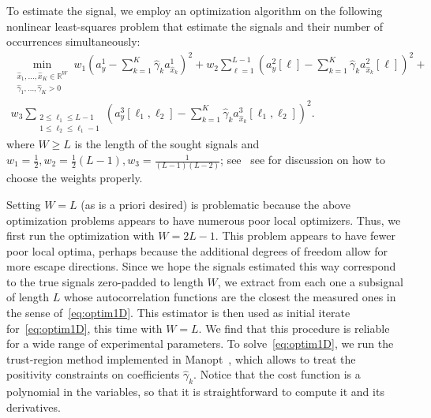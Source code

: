 \documentclass[english,11pt]{article}
\newcommand{\1}{\mathbf{1}}
\newcommand{\TODO}[1]{{\color{red}{[#1]}}}
\numberwithin{equation}{section}
\theoremstyle{plain}
\theoremstyle{definition}
\theoremstyle{remark}
\theoremstyle{plain}
\theoremstyle{remark}
\theoremstyle{plain}
\theoremstyle{plain}
\newcommand{\reals}{\mathbb{R}}
\begin{document}
To estimate the signal, we employ an optimization algorithm on the following nonlinear least-squares problem that estimate the signals and their number of occurrences simultaneously:
\begin{multline}
\min_{\substack{\hat x_1, \ldots, \hat x_K \in \reals^{W} \\ \hat \gamma_1, \ldots, \hat \gamma_K > 0}} w_1 \left( a_y^1 - \sum_{k=1}^K \hat \gamma_k a_{\hat x_k}^1 \right)^2 + w_2 \sum_{\ell = 1}^{L-1} \left( a_y^2[\ell] - \sum_{k=1}^K \hat \gamma_k a_{\hat x_k}^2[\ell] \right)^2 + \\ w_3 \sum_{\substack{2\leq\ell_1\leq L-1 \\ 1 \leq \ell_2 \leq \ell_1-1}} \left( a_y^3[\ell_1, \ell_2] - \sum_{k=1}^K \hat \gamma_k a_{\hat x_k}^3[\ell_1,\ell_2] \right)^2.
\label{eq:optim1D}
\end{multline}
where $W \geq L$ is the length of the sought signals and $w_1 = \frac{1}{2}, w_2 =\frac{1}{2}(L-1), w_3 = \frac{1}{(L-1)(L-2)}$; see~\cite{boumal2017heterogeneous} see for discussion on how to choose the weights properly.


 Setting $W = L$ (as is a priori desired) is problematic because the above optimization problems appears to have numerous poor local optimizers.
Thus, we first run the optimization with $W = 2L-1$. This problem appears to have fewer poor local optima, perhaps because the additional degrees of freedom allow for more escape directions. Since we hope the signals estimated this way correspond to the true signals zero-padded to length $W$, we extract from each one a subsignal of length $L$ whose autocorrelation functions are the closest the measured ones in the sense of~\eqref{eq:optim1D}. 
This estimator is then used as initial iterate for~\eqref{eq:optim1D}, this time with $W = L$. We find that this procedure is reliable for a wide range of experimental parameters. To solve~\eqref{eq:optim1D}, we run the trust-region method implemented in Manopt~\cite{manopt}, which allows to treat the positivity constraints \TODO{reference} on coefficients $\hat \gamma_k$. Notice that the cost function is a polynomial in the variables, so that it is straightforward to compute it and its derivatives.
\end{document}
